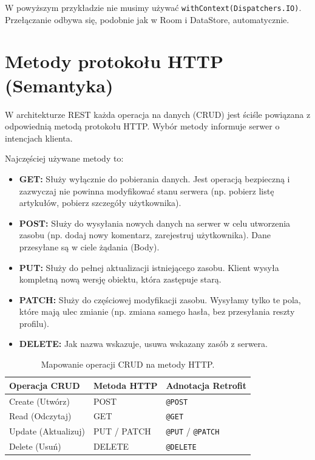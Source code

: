 W powyższym przykładzie nie musimy używać \texttt{withContext(Dispatchers.IO)}. Przełączanie odbywa się, podobnie jak w Room i DataStore, automatycznie.

\section{Metody protokołu HTTP (Semantyka)}

W architekturze REST każda operacja na danych (CRUD) jest ściśle powiązana z odpowiednią metodą protokołu HTTP. Wybór metody informuje serwer o intencjach klienta.

Najczęściej używane metody to:

\begin{itemize}
    \item \textbf{GET:} Służy wyłącznie do pobierania danych. Jest operacją bezpieczną i zazwyczaj nie powinna modyfikować stanu serwera (np. pobierz listę artykułów, pobierz szczegóły użytkownika).
    \item \textbf{POST:} Służy do wysyłania nowych danych na serwer w celu utworzenia zasobu (np. dodaj nowy komentarz, zarejestruj użytkownika). Dane przesyłane są w ciele żądania (Body).
    \item \textbf{PUT:} Służy do pełnej aktualizacji istniejącego zasobu. Klient wysyła kompletną nową wersję obiektu, która zastępuje starą.
    \item \textbf{PATCH:} Służy do częściowej modyfikacji zasobu. Wysyłamy tylko te pola, które mają ulec zmianie (np. zmiana samego hasła, bez przesyłania reszty profilu).
    \item \textbf{DELETE:} Jak nazwa wskazuje, usuwa wskazany zasób z serwera.
\end{itemize}

\begin{table}[h]
\centering
\begin{tabular}{|l|l|l|}
\hline
\textbf{Operacja CRUD} & \textbf{Metoda HTTP} & \textbf{Adnotacja Retrofit} \\ \hline
Create (Utwórz)        & POST                 & \texttt{@POST}              \\ \hline
Read (Odczytaj)        & GET                  & \texttt{@GET}               \\ \hline
Update (Aktualizuj)    & PUT / PATCH          & \texttt{@PUT} / \texttt{@PATCH} \\ \hline
Delete (Usuń)          & DELETE               & \texttt{@DELETE}            \\ \hline
\end{tabular}
\caption{Mapowanie operacji CRUD na metody HTTP.}
\end{table}

